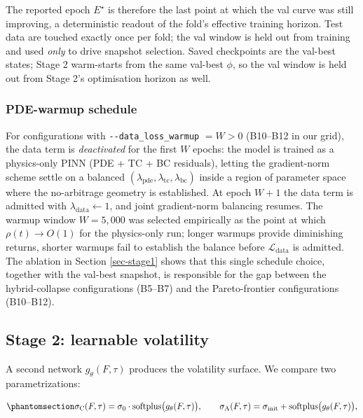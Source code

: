 \documentclass[
  11pt,
]{article}
\begin{document}
The reported epoch \(E^\star\) is therefore the last point at which the
val curve was still improving, a deterministic readout of the fold's
effective training horizon. Test data are touched exactly once per fold;
the val window is held out from training and used \emph{only} to drive
snapshot selection. Saved checkpoints are the val-best states; Stage 2
warm-starts from the same val-best \(\phi\), so the val window is held
out from Stage 2's optimisation horizon as well.

\subsubsection{PDE-warmup schedule}\label{pde-warmup-schedule}

For configurations with \texttt{-\/-data\_loss\_warmup} \(= W > 0\)
(B10--B12 in our grid), the data term is \emph{deactivated} for the
first \(W\) epochs: the model is trained as a physics-only PINN (PDE +
TC + BC residuals), letting the gradient-norm scheme settle on a
balanced
\((\lambda_\mathrm{pde},\lambda_\mathrm{tc},\lambda_\mathrm{bc})\)
inside a region of parameter space where the no-arbitrage geometry is
established. At epoch \(W{+}1\) the data term is admitted with
\(\lambda_\mathrm{data}\!\leftarrow\!1\), and joint gradient-norm
balancing resumes. The warmup window \(W{=}5,000\) was selected
empirically as the point at which \(\rho(t) \to O(1)\) for the
physics-only run; longer warmups provide diminishing returns, shorter
warmups fail to establish the balance before
\(\mathcal{L}_\mathrm{data}\) is admitted. The ablation in Section
\ref{sec-stage1} shows that this single schedule choice, together with
the val-best snapshot, is responsible for the gap between the
hybrid-collapse configurations (B5--B7) and the Pareto-frontier
configurations (B10--B12).

\subsection{Stage 2: learnable
volatility}\label{stage-2-learnable-volatility}

A second network \(g_\theta(F,\tau)\) produces the volatility surface.
We compare two parametrizations:

\begin{equation}\phantomsection\label{eq-vol-params}{
\sigma_\mathrm{C}(F,\tau)
  = \sigma_0 \cdot \mathrm{softplus}\bigl(g_\theta(F,\tau)\bigr),
\qquad
\sigma_\mathrm{A}(F,\tau)
  = \sigma_\mathrm{init} + \mathrm{softplus}\bigl(g_\theta(F,\tau)\bigr),
}\end{equation}
\end{document}
